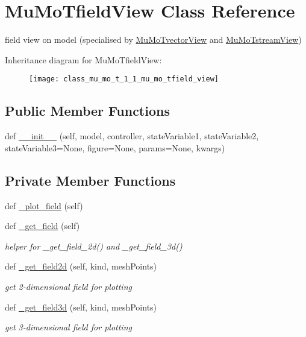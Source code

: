 \hypertarget{class_mu_mo_t_1_1_mu_mo_tfield_view}{}\section{Mu\+Mo\+Tfield\+View Class Reference}
\label{class_mu_mo_t_1_1_mu_mo_tfield_view}


field view on model (specialised by \hyperlink{class_mu_mo_t_1_1_mu_mo_tvector_view}{Mu\+Mo\+Tvector\+View} and \hyperlink{class_mu_mo_t_1_1_mu_mo_tstream_view}{Mu\+Mo\+Tstream\+View})  


Inheritance diagram for Mu\+Mo\+Tfield\+View\+:\begin{figure}[H]
\begin{center}
\leavevmode
\texttt{[image: class\_mu\_mo\_t\_1\_1\_mu\_mo\_tfield\_view]}
\end{center}
\end{figure}
\subsection*{Public Member Functions}
\begin{DoxyCompactItemize}
\item 
def \hyperlink{class_mu_mo_t_1_1_mu_mo_tfield_view_a78d68546a28ea07c46f5f4a44ddfa49a}{\+\_\+\+\_\+init\+\_\+\+\_\+} (self, model, controller, state\+Variable1, state\+Variable2, state\+Variable3=None, figure=None, params=None, kwargs)
\end{DoxyCompactItemize}
\subsection*{Private Member Functions}
\begin{DoxyCompactItemize}
\item 
def \hyperlink{class_mu_mo_t_1_1_mu_mo_tfield_view_a50d59419298116f738a98c864afb9d89}{\+\_\+plot\+\_\+field} (self)
\item 
def \hyperlink{class_mu_mo_t_1_1_mu_mo_tfield_view_aefbf0e354438e17ab6d48e2d368f8540}{\+\_\+get\+\_\+field} (self)
\begin{DoxyCompactList}\small\item\em helper for \+\_\+get\+\_\+field\+\_\+2d() and \+\_\+get\+\_\+field\+\_\+3d() \end{DoxyCompactList}\item 
def \hyperlink{class_mu_mo_t_1_1_mu_mo_tfield_view_a854f5f5badcda687eff8a999e6700cb7}{\+\_\+get\+\_\+field2d} (self, kind, mesh\+Points)
\begin{DoxyCompactList}\small\item\em get 2-\/dimensional field for plotting \end{DoxyCompactList}\item 
def \hyperlink{class_mu_mo_t_1_1_mu_mo_tfield_view_a7e92a660924e058d070dd1799c27f126}{\+\_\+get\+\_\+field3d} (self, kind, mesh\+Points)
\begin{DoxyCompactList}\small\item\em get 3-\/dimensional field for plotting \end{DoxyCompactList}\end{DoxyCompactItemize}
